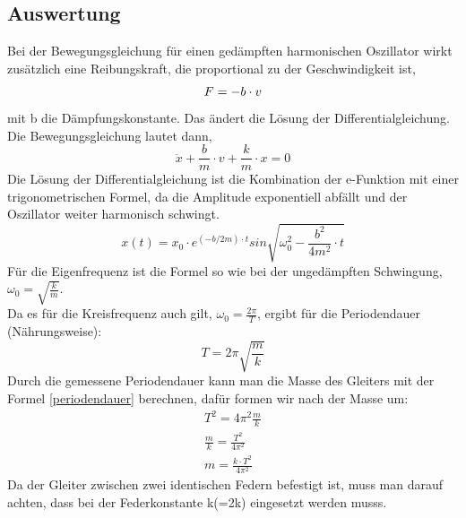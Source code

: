 \documentclass{article}
\begin{document}
      \subsection{Auswertung}
          Bei der Bewegungsgleichung für einen gedämpften harmonischen Oszillator wirkt zusätzlich eine Reibungskraft, die proportional zu der Geschwindigkeit ist,
          \begin{equation}
              F= -b\cdot v\\
          \end{equation}
          mit b die Dämpfungskonstante.
          Das ändert die Lösung der Differentialgleichung.
          Die Bewegungsgleichung lautet dann,
          \begin{equation}
              \ddot{x}+\frac{b}{m}\cdot v+ \frac{k}{m} \cdot x=0
          \end{equation}
          Die Lösung der Differentialgleichung ist die Kombination der e-Funktion mit einer trigonometrischen Formel, da die Amplitude exponentiell abfällt und der Oszillator weiter harmonisch schwingt.
          \begin{equation}
              x(t)= x_0 \cdot e^{ (-b/2m)\cdot t} sin\sqrt{\omega_0^2-\frac{b^2}{4m^2}\cdot t}
          \end{equation}
          Für die Eigenfrequenz ist die Formel so wie bei der ungedämpften Schwingung,
          $\omega_0= \sqrt{\frac{k}{m}}$.\\
          Da es für die Kreisfrequenz auch gilt, $\omega_0=\frac{2\pi}{T}$, ergibt für die Periodendauer (Nährungsweise):
          \begin{equation}\label{periodendauer}
              T=2\pi \sqrt{\frac{m}{k}}
          \end{equation}
          Durch die gemessene Periodendauer kann man die Masse des Gleiters mit der Formel \ref{periodendauer} berechnen, dafür formen wir nach der Masse um:
          \begin{equation}\label{formelm}
              \begin{gathered}
                  T^2=4\pi^2 \frac{m}{k}\\
                  \frac{m}{k}= \frac{T^2}{4\pi^2}\\
                  m= \frac{k\cdot T^2}{4\pi^2}
              \end{gathered}
          \end{equation}
          Da der Gleiter zwischen zwei identischen Federn befestigt ist, muss man darauf achten, dass bei der Federkonstante k(=2k) eingesetzt werden musss.\\
\end{document}
